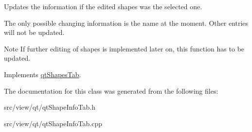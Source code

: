 Updates the information if the edited shapes was the selected one. 

The only possible changing information is the name at the moment. Other entries will not be updated. \begin{DoxyNote}{Note}
If further editing of shapes is implemented later on, this function has to be updated. 
\end{DoxyNote}


Implements \hyperlink{classqt_shapes_tab_a7e6ef278c299ef8934b6c1164b90574a}{qt\+Shapes\+Tab}.



The documentation for this class was generated from the following files\+:\begin{DoxyCompactItemize}
\item 
src/view/qt/qt\+Shape\+Info\+Tab.\+h\item 
src/view/qt/qt\+Shape\+Info\+Tab.\+cpp\end{DoxyCompactItemize}
